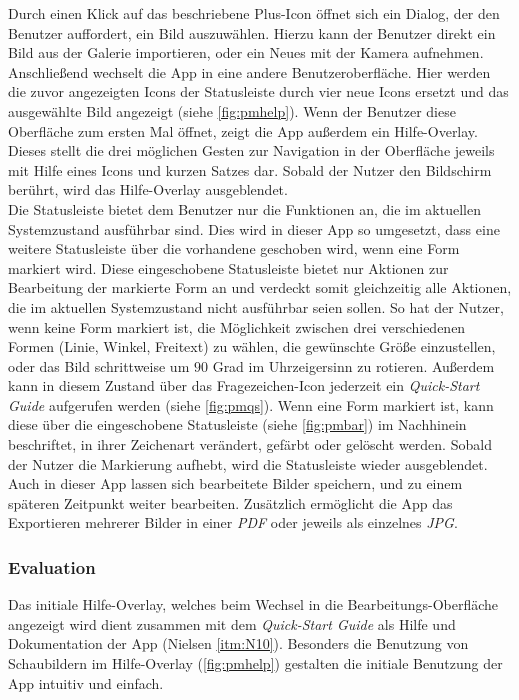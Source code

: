 \noindent
Durch einen Klick auf das beschriebene Plus-Icon öffnet sich ein Dialog, der den Benutzer auffordert, ein Bild auszuwählen.
Hierzu kann der Benutzer direkt ein Bild aus der Galerie importieren, oder ein Neues mit der Kamera aufnehmen. \\

Anschließend wechselt die App in eine andere Benutzeroberfläche.
Hier werden die zuvor angezeigten Icons der Statusleiste durch vier neue Icons ersetzt und das ausgewählte Bild angezeigt (siehe \autoref{fig:pmhelp}).
Wenn der Benutzer diese Oberfläche zum ersten Mal öffnet, zeigt die App außerdem ein Hilfe-Overlay.
Dieses stellt die drei möglichen Gesten zur Navigation in der Oberfläche jeweils mit Hilfe eines Icons und kurzen Satzes dar. 
Sobald der Nutzer den Bildschirm berührt, wird das Hilfe-Overlay ausgeblendet. \\

Die Statusleiste bietet dem Benutzer nur die Funktionen an, die im aktuellen Systemzustand ausführbar sind.
Dies wird in dieser App so umgesetzt, dass eine weitere Statusleiste über die vorhandene geschoben wird, wenn eine Form markiert wird.
Diese eingeschobene Statusleiste bietet nur Aktionen zur Bearbeitung der markierte Form an und verdeckt somit gleichzeitig alle Aktionen, die im aktuellen Systemzustand nicht ausführbar seien sollen.
So hat der Nutzer, wenn keine Form markiert ist, die Möglichkeit zwischen drei verschiedenen Formen (Linie, Winkel, Freitext) zu wählen, die gewünschte Größe einzustellen, oder das Bild schrittweise um $90$ Grad im Uhrzeigersinn zu rotieren.
Außerdem kann in diesem Zustand über das Fragezeichen-Icon jederzeit ein \emph{Quick-Start Guide} aufgerufen werden (siehe \autoref{fig:pmqs}).
Wenn eine Form markiert ist, kann diese über die eingeschobene Statusleiste (siehe \autoref{fig:pmbar}) im Nachhinein beschriftet, in ihrer Zeichenart verändert, gefärbt oder gelöscht werden.
Sobald der Nutzer die Markierung aufhebt, wird die Statusleiste wieder ausgeblendet. \\

Auch in dieser App lassen sich bearbeitete Bilder speichern, und zu einem späteren Zeitpunkt weiter bearbeiten.
Zusätzlich ermöglicht die App das Exportieren mehrerer Bilder in einer \emph{PDF} oder jeweils als einzelnes \emph{JPG}.

\subsubsection{Evaluation}\label{subsec:pmeva}
Das initiale Hilfe-Overlay, welches beim Wechsel in die Bearbeitungs-Oberfläche angezeigt wird dient zusammen mit dem \emph{Quick-Start Guide} als Hilfe und Dokumentation der App (Nielsen \autoref{itm:N10}).
Besonders die Benutzung von Schaubildern im Hilfe-Overlay (\autoref{fig:pmhelp}) gestalten die initiale Benutzung der App intuitiv und einfach. \\

